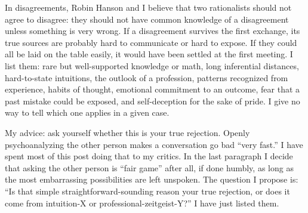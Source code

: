 In disagreements, Robin Hanson and I believe that two rationalists should not agree to disagree: they should not have common knowledge of a disagreement unless something is very wrong. If a disagreement survives the first exchange, its true sources are probably hard to communicate or hard to expose. If they could all be laid on the table easily, it would have been settled at the first meeting. I list them: rare but well-supported knowledge or math, long inferential distances, hard-to-state intuitions, the outlook of a profession, patterns recognized from experience, habits of thought, emotional commitment to an outcome, fear that a past mistake could be exposed, and self-deception for the sake of pride. I give no way to tell which one applies in a given case.

My advice: ask yourself whether this is your true rejection. Openly psychoanalyzing the other person makes a conversation go bad ``very fast.'' I have spent most of this post doing that to my critics. In the last paragraph I decide that asking the other person is ``fair game'' after all, if done humbly, as long as the most embarrassing possibilities are left unspoken. The question I propose is: ``Is that simple straightforward-sounding reason your true rejection, or does it come from intuition-X or professional-zeitgeist-Y?'' I have just listed them.

